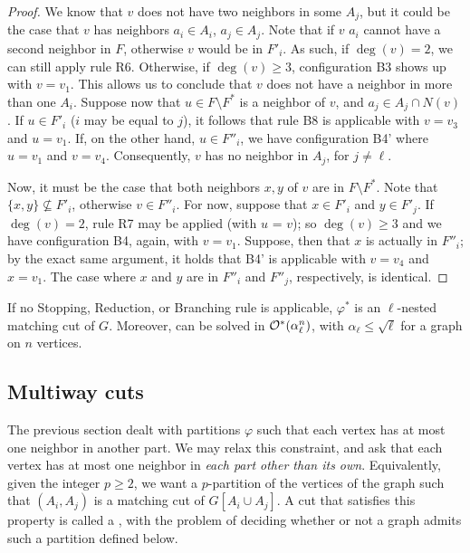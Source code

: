 \begin{proof}
	We know that $v$ does not have two neighbors in some $A_j$, but it could be the case that $v$ has neighbors $a_i \in A_i$, $a_j \in A_j$.
	Note that if $v$ $a_i$ cannot have a second  neighbor in $F$, otherwise $v$ would be in $F'_i$.
	As such, if $\deg(v) = 2$, we can still apply rule R6.
	Otherwise, if $\deg(v) \geq 3$, configuration B3 shows up with $v = v_1$.
	This allows us to conclude that $v$ does not have a neighbor in more than one $A_i$.
	Suppose now that $u \in F \setminus F^*$ is a neighbor of $v$, and $a_j \in A_j \cap N(v)$.
	If $u \in F'_i$ ($i$ may be equal to $j$), it follows that rule B8 is applicable with $v = v_3$ and $u = v_1$.
	If, on the other hand, $u \in F''_i$, we have configuration B4' where $u = v_1$ and $v = v_4$.
	Consequently, $v$ has no neighbor in $A_j$, for $j \neq \ell$.
	
	Now, it must be the case that both neighbors $x,y$ of $v$ are in $F \setminus F^*$.
	Note that $\{x,y\} \nsubseteq F'_i$, otherwise $v \in F''_i$.
	For now, suppose that $x \in F'_i$ and $y \in F'_j$.
	If $\deg(v) = 2$, rule R7 may be applied (with $u$ = $v$); so $\deg(v) \geq 3$ and we have configuration B4, again, with $v = v_1$.
	Suppose, then that $x$ is actually in $F''_i$; by the exact same argument, it holds that B4' is applicable with $v = v_4$ and $x = v_1$.
	The case where $x$ and $y$ are in $F''_i$ and $F''_j$, respectively, is identical.
\end{proof}

\begin{theorem}
	If no Stopping, Reduction, or Branching rule is applicable, $\varphi^*$ is an $\ell$-nested matching cut of $G$.
	Moreover,  can be solved in $\mathcal{O}^*\!\left(\alpha_\ell^n\right)$, with $\alpha_\ell \leq \sqrt{\ell}$ for a graph on $n$ vertices.
\end{theorem}



\subsection{Multiway cuts}

The previous section dealt with partitions $\varphi$ such that each vertex has at most one neighbor in another part.
We may relax this constraint, and ask that each vertex has at most one neighbor in \textit{each part other than its own}.
Equivalently, given the integer $p \geq 2$, we want a $p$-partition of the vertices of the graph such that $(A_i, A_j)$ is a matching cut of $G[A_i \cup A_j]$.
A cut that satisfies this property is called a , with the problem of deciding whether or not a graph admits such a partition defined below.

